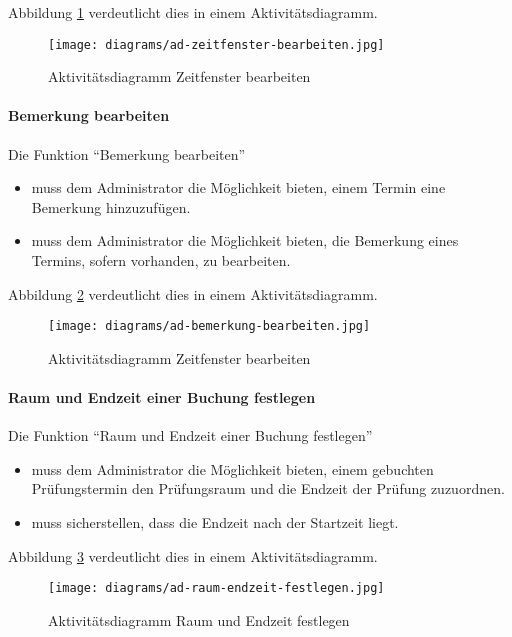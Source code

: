 Abbildung \ref{fig:ad-zeitfenster-bearbeiten} verdeutlicht dies in einem Aktivitätsdiagramm.

\begin{figure}
  \centering
  \texttt{[image: diagrams/ad-zeitfenster-bearbeiten.jpg]}
  \caption{Aktivitätsdiagramm Zeitfenster bearbeiten}
\label{fig:ad-zeitfenster-bearbeiten}
\end{figure}

\paragraph{Bemerkung bearbeiten}

Die Funktion ``Bemerkung bearbeiten''
\begin{itemize}
  \item muss dem Administrator die Möglichkeit bieten, einem Termin eine Bemerkung hinzuzufügen.
  \item muss dem Administrator die Möglichkeit bieten, die Bemerkung eines Termins, sofern vorhanden, zu bearbeiten.
\end{itemize}

Abbildung \ref{fig:ad-bemerkung-bearbeiten} verdeutlicht dies in einem Aktivitätsdiagramm.

\begin{figure}
  \centering
  \texttt{[image: diagrams/ad-bemerkung-bearbeiten.jpg]}
  \caption{Aktivitätsdiagramm Zeitfenster bearbeiten}
  \label{fig:ad-bemerkung-bearbeiten}
\end{figure}

\paragraph{Raum und Endzeit einer Buchung festlegen}
Die Funktion ``Raum und Endzeit einer Buchung festlegen''
\begin{itemize}
  \item muss dem Administrator die Möglichkeit bieten, einem gebuchten Prüfungstermin den Prüfungsraum und die Endzeit der Prüfung zuzuordnen.
  \item muss sicherstellen, dass die Endzeit nach der Startzeit liegt.
\end{itemize}

Abbildung \ref{fig:ad-raum-endzeit-festlegen} verdeutlicht dies in einem Aktivitätsdiagramm.

\begin{figure}
  \centering
  \texttt{[image: diagrams/ad-raum-endzeit-festlegen.jpg]}
  \caption{Aktivitätsdiagramm Raum und Endzeit festlegen}
  \label{fig:ad-raum-endzeit-festlegen}
\end{figure}

